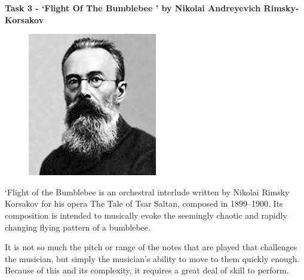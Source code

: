 \documentclass{article}
\begin{document}
\begin{center}
    \fontsize{18}{22}\selectfont
    \textbf{Task 3 - ‘Flight Of The Bumblebee ’ by Nikolai Andreyevich Rimsky-Korsakov
}
\end{center}

\vspace{1em}

\setlength{\columnsep}{1.5em}
\begin{figure}
    \vspace{-0.8em}
    \centering
    \includegraphics[width=\linewidth]{t3pic.jpg} %
\end{figure}

\noindent‘Flight of the Bumblebee is an orchestral interlude written by Nikolai Rimsky Korsakov for his opera The Tale of Tsar Saltan, composed in 1899–1900. Its composition is intended to musically evoke the seemingly chaotic and rapidly changing flying pattern of a bumblebee. 


\par \noindent It is not so much the pitch or range of the notes that are played that challenges the musician, but simply the musician's ability to move to them quickly enough. Because of this and its complexity, it requires a great deal of skill to perform.
\end{document}

